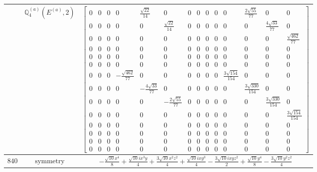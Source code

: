 \documentclass[fleqn,8pt,landscape]{jsarticle}
\begin{document}
\begin{longtable}{ccc}
$  $ & $ \mathbb{Q}_{4}^{(a)}(E^{(a)},2) $ & $ \begin{bmatrix} 0 & 0 & 0 & 0 & \frac{\sqrt{22}}{14} & 0 & 0 & 0 & 0 & 0 & 0 & \frac{2 \sqrt{55}}{77} & 0 & 0 \\ 0 & 0 & 0 & 0 & 0 & \frac{\sqrt{22}}{14} & 0 & 0 & 0 & 0 & 0 & 0 & \frac{4 \sqrt{33}}{77} & 0 \\ 0 & 0 & 0 & 0 & 0 & 0 & 0 & 0 & 0 & 0 & 0 & 0 & 0 & \frac{\sqrt{462}}{77} \\ 0 & 0 & 0 & 0 & 0 & 0 & 0 & 0 & 0 & 0 & 0 & 0 & 0 & 0 \\ 0 & 0 & 0 & 0 & 0 & 0 & 0 & 0 & 0 & 0 & 0 & 0 & 0 & 0 \\ 0 & 0 & 0 & 0 & 0 & 0 & 0 & 0 & 0 & 0 & 0 & 0 & 0 & 0 \\ 0 & 0 & 0 & - \frac{\sqrt{462}}{77} & 0 & 0 & 0 & 0 & 0 & 0 & \frac{3 \sqrt{154}}{154} & 0 & 0 & 0 \\ 0 & 0 & 0 & 0 & - \frac{4 \sqrt{33}}{77} & 0 & 0 & 0 & 0 & 0 & 0 & \frac{3 \sqrt{330}}{154} & 0 & 0 \\ 0 & 0 & 0 & 0 & 0 & - \frac{2 \sqrt{55}}{77} & 0 & 0 & 0 & 0 & 0 & 0 & \frac{3 \sqrt{330}}{154} & 0 \\ 0 & 0 & 0 & 0 & 0 & 0 & 0 & 0 & 0 & 0 & 0 & 0 & 0 & \frac{3 \sqrt{154}}{154} \\ 0 & 0 & 0 & 0 & 0 & 0 & 0 & 0 & 0 & 0 & 0 & 0 & 0 & 0 \\ 0 & 0 & 0 & 0 & 0 & 0 & 0 & 0 & 0 & 0 & 0 & 0 & 0 & 0 \\ 0 & 0 & 0 & 0 & 0 & 0 & 0 & 0 & 0 & 0 & 0 & 0 & 0 & 0 \\ 0 & 0 & 0 & 0 & 0 & 0 & 0 & 0 & 0 & 0 & 0 & 0 & 0 & 0 \end{bmatrix} $ \\ \hline
$ 840 $ & $ \text{symmetry} $ & $ - \frac{\sqrt{10} x^{4}}{8} + \frac{\sqrt{10} i x^{3} y}{4} + \frac{3 \sqrt{10} x^{2} z^{2}}{4} + \frac{\sqrt{10} i x y^{3}}{4} - \frac{3 \sqrt{10} i x y z^{2}}{2} + \frac{\sqrt{10} y^{4}}{8} - \frac{3 \sqrt{10} y^{2} z^{2}}{4} $ \\

\end{longtable}
\end{document}
